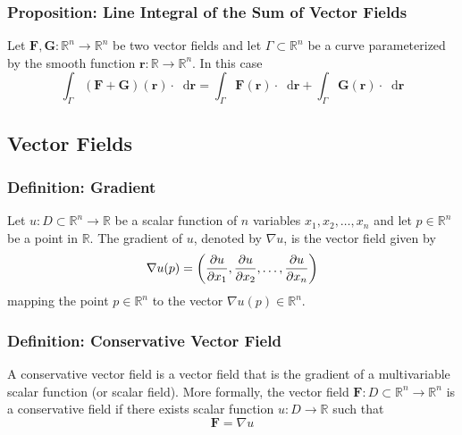 \documentclass[11pt, a4paper]{article}
\newcommand{\diff}{\mathop{}\!\mathrm{d}} %
\begin{document}
\subsubsection{Proposition: Line Integral of the Sum of Vector Fields}
Let $ \bm{F}, \bm{G} : \mathbb{R}^n \rightarrow \mathbb{R}^n $ be two vector fields and let $ \Gamma \subset \mathbb{R}^n$ be a curve parameterized by the smooth function $ \bm{r} : \mathbb{R} \rightarrow \mathbb{R}^n $. In this case
\begin{equation*}
	\int_{\Gamma} \left(\bm{F} + \bm{G}\right)(\bm{r}) \cdot \diff \bm{r} = \int_{\Gamma} \bm{F}(\bm{r}) \cdot \diff \bm{r} + \int_{\Gamma} \bm{G}(\bm{r}) \cdot \diff \bm{r}
\end{equation*}

\subsection{Vector Fields}
	
\subsubsection{Definition: Gradient}
Let $ u : D \subset \mathbb{R}^n \rightarrow \mathbb{R}$ be a scalar function of $ n $ variables $ x_1, x_2, \dots, x_n $ and let $ p \in \mathbb{R}^n $ be a point in $ \mathbb{R} $. The gradient of $ u $, denoted by $ \nabla u $, is the vector field given by
\begin{equation*}
	\nabla u(p) = \left(\pdv{u}{x_1} (p), \pdv{u}{x_2} (p), \dots, \pdv{u}{x_n} (p)\right)
\end{equation*}
mapping the point $ p \in \mathbb{R}^n $ to the vector $ \nabla u(p) \in \mathbb{R}^n $.

\subsubsection{Definition: Conservative Vector Field}
A conservative vector field is a vector field that is the gradient of a multivariable scalar function (or scalar field). More formally, the vector field $ \bm{F} :  D \subset \mathbb{R}^n \rightarrow \mathbb{R}^n $ is a conservative field if there exists scalar function $ u : D \rightarrow \mathbb{R} $ such that
\begin{equation*}
	\bm{F} = \nabla u
\end{equation*}
\end{document}
